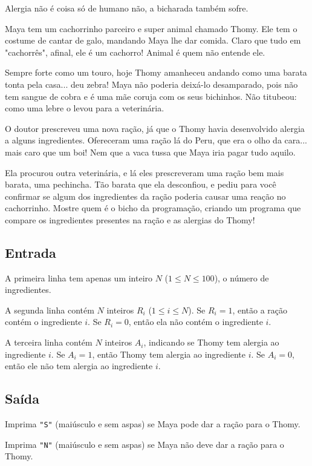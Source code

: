 Alergia não é coisa só de humano não, a bicharada também sofre.

Maya tem um cachorrinho parceiro e super animal chamado Thomy. Ele tem o costume de cantar de galo, mandando Maya lhe dar comida. Claro que tudo em "cachorrês", afinal, ele é um cachorro! Animal é quem não entende ele.

Sempre forte como um touro, hoje Thomy amanheceu andando como uma barata tonta pela casa... deu zebra! Maya não poderia deixá-lo desamparado, pois não tem sangue de cobra e é uma mãe coruja com os seus bichinhos. Não titubeou: como uma lebre o levou para a veterinária.

O doutor prescreveu uma nova ração, já que o Thomy havia desenvolvido alergia a alguns ingredientes. Ofereceram uma ração lá do Peru, que era o olho da cara... mais caro que um boi! Nem que a vaca tussa que Maya iria pagar tudo aquilo.

Ela procurou outra veterinária, e lá eles prescreveram uma ração bem mais barata, uma pechincha. Tão barata que ela desconfiou, e pediu para você confirmar se algum dos ingredientes da ração poderia causar uma reação no cachorrinho. Mostre quem é o bicho da programação, criando um programa que compare os ingredientes presentes na ração e as alergias do Thomy!

\subsection*{Entrada}
A primeira linha tem apenas um inteiro $N$ ($1\leq N \leq 100$), o número de ingredientes.

A segunda linha contém $N$ inteiros $R_i$ ($1\leq i \leq N$). Se $R_i=1$, então a ração contém o ingrediente $i$. Se $R_i=0$, então ela não contém o ingrediente $i$.

A terceira linha contém $N$ inteiros $A_i$, indicando se Thomy tem alergia ao ingrediente $i$. Se $A_i=1$, então Thomy tem alergia ao ingrediente $i$. Se $A_i=0$, então ele não tem alergia ao ingrediente $i$.

\subsection*{Saída}
Imprima \texttt{"S"} (maiúsculo e sem aspas) se Maya pode dar a ração para o Thomy.

Imprima \texttt{"N"} (maiúsculo e sem aspas) se Maya não deve dar a ração para o Thomy.

